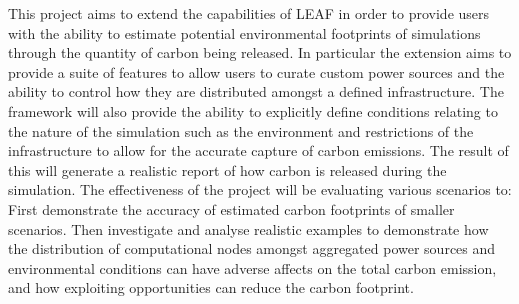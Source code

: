 \documentclass{l4proj}
\begin{document}
This project aims to extend the capabilities of LEAF in order to provide users with the ability to estimate potential environmental footprints
of simulations through the quantity of carbon being released.
In particular the extension aims to provide a suite of features to allow users to curate custom power sources and the ability to control
how they are distributed amongst a defined infrastructure.
The framework will also provide the ability to explicitly define conditions relating to the nature of the simulation
such as the environment and restrictions of the infrastructure to allow for the accurate capture of carbon emissions.
The result of this will generate a realistic report of how carbon is released during the simulation.
The effectiveness of the project will be evaluating various scenarios to:
First demonstrate the accuracy of estimated carbon footprints of
smaller scenarios.
Then investigate and analyse realistic examples to demonstrate how the distribution of computational nodes amongst
aggregated power sources and environmental conditions can have adverse affects on the total carbon emission, and how
exploiting opportunities can reduce the carbon footprint.
%
%
\end{document}
